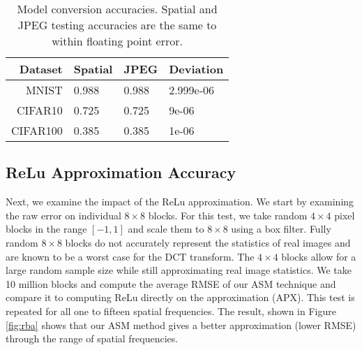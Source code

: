 \documentclass[10pt,twocolumn,letterpaper]{article}
\begin{document}
\begin{table}[h]
    \centering
    \begin{tabular}{|r|l|l|l|}
        \hline
        Dataset & Spatial & JPEG & Deviation \\ \hline
        MNIST & 0.988 & 0.988 & 2.999e-06 \\ \hline
        CIFAR10 & 0.725 & 0.725 & 9e-06 \\ \hline
        CIFAR100 & 0.385 & 0.385 & 1e-06 \\ \hline
    \end{tabular}
    \caption{Model conversion accuracies. Spatial and JPEG testing accuracies are the same to within floating point error.}
    \label{tab:mc}
\end{table}\subsection{ReLu Approximation Accuracy}\label{sec:exprla}

Next, we examine the impact of the ReLu approximation. We start by examining the raw error on individual $8 \times 8$ blocks. For this test, we take random $4 \times 4$ pixel blocks in the range $[-1, 1]$ and scale them to $8 \times 8$ using a box filter. Fully random $8 \times 8$ blocks do not accurately represent the statistics of real images and are known to be a worst case for the DCT transform. The $4 \times 4$ blocks allow for a large random sample size while still approximating real image statistics. We take 10 million blocks and compute the average RMSE of our ASM technique and compare it to computing ReLu directly on the approximation (APX). This test is repeated for all one to fifteen spatial frequencies. The result, shown in Figure \ref{fig:rba} shows that our ASM method gives a better approximation (lower RMSE) through the range of spatial frequencies. 
\end{document}
